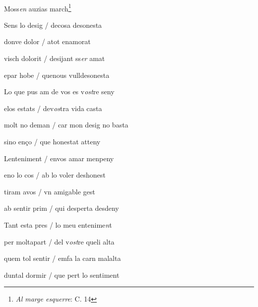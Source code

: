 \documentclass[12pt]{article}
\renewcommand{\espaiAbansEtiquetaPoema}{\vspace{0ex}}
\begin{document}
\begin{estrofa}

\espaiAbansEtiquetaPoema

\\

\begin{rubrica}

\pagina{[140v]} Moss\textit{en} auzias march\footnote{\textit{Al marge
esquerre}: C. 14}

\end{rubrica}

\end{estrofa}


\begin{estrofa}

 Sens lo desig / decosa desonesta

 donve dolor / atot enamorat

 visch dolorit / desijant ss\textit{er }amat

 epar hobe / quenous vulldesonesta

 Lo que pus am de vos es v\textit{ost}re seny

 elos estats / dev\textit{os}tra vida casta

 molt no deman / car mon desig no basta

 sino en\c{c}o / que honestat atteny

\end{estrofa}



\begin{estrofa}

 Lenteniment / envos amar menpeny

 eno lo cos / ab lo voler deshonest

 tiram avos / vn amigable gest

 ab sentir prim / qui desperta desdeny

 Tant esta pres / lo meu entenime\textit{n}t

 per moltapart / del v\textit{ost}re queli alta

 quem tol sentir / emfa la carn malalta

 duntal dormir / que pert lo sentiment

\end{estrofa}
\end{document}
